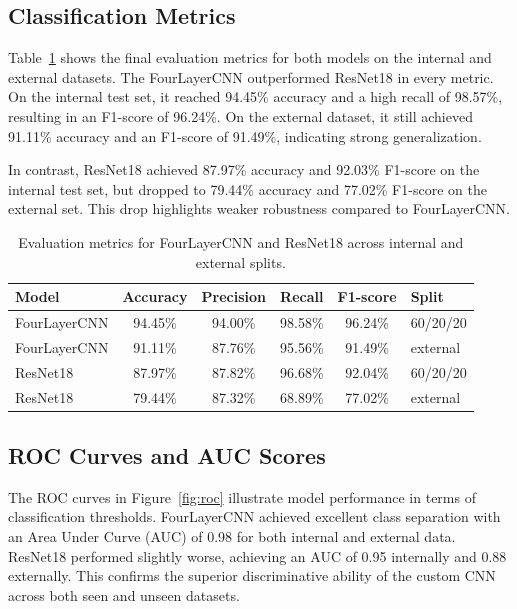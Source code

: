 \documentclass[a4paper,11pt]{article}
\begin{document}
\subsection{Classification Metrics}

Table~\ref{tab:metrics_summary} shows the final evaluation metrics for both models on the internal and external datasets. The FourLayerCNN outperformed ResNet18 in every metric. On the internal test set, it reached 94.45\% accuracy and a high recall of 98.57\%, resulting in an F1-score of 96.24\%. On the external dataset, it still achieved 91.11\% accuracy and an F1-score of 91.49\%, indicating strong generalization.

\vspace{0.2cm}In contrast, ResNet18 achieved 87.97\% accuracy and 92.03\% F1-score on the internal test set, but dropped to 79.44\% accuracy and 77.02\% F1-score on the external set. This drop highlights weaker robustness compared to FourLayerCNN.

\begin{table}[H]
    \centering
    \caption[Evaluation Results Summary]{Evaluation metrics for FourLayerCNN and ResNet18 across internal and external splits.}
    \label{tab:metrics_summary}
    \begin{tabular}{|l|c|c|c|c|l|}
        \hline
        \textbf{Model} & \textbf{Accuracy} & \textbf{Precision} & \textbf{Recall} & \textbf{F1-score} & \textbf{Split} \\
        \hline
        FourLayerCNN & 94.45\% & 94.00\% & 98.58\% & 96.24\% & 60/20/20 \\
        FourLayerCNN & 91.11\% & 87.76\% & 95.56\% & 91.49\% & external \\
        ResNet18     & 87.97\% & 87.82\% & 96.68\% & 92.04\% & 60/20/20 \\
        ResNet18     & 79.44\% & 87.32\% & 68.89\% & 77.02\% & external \\
        \hline
    \end{tabular}
\end{table}

\subsection{ROC Curves and AUC Scores}

The ROC curves in Figure~\ref{fig:roc} illustrate model performance in terms of classification thresholds. FourLayerCNN achieved excellent class separation with an Area Under Curve (AUC) of 0.98 for both internal and external data. ResNet18 performed slightly worse, achieving an AUC of 0.95 internally and 0.88 externally. This confirms the superior discriminative ability of the custom CNN across both seen and unseen datasets.
\end{document}
